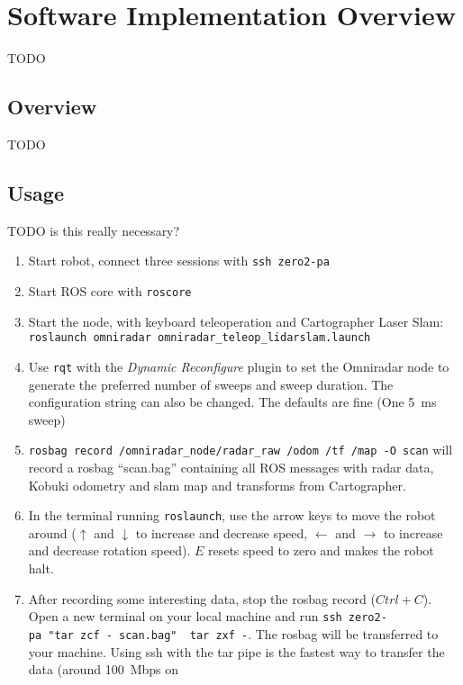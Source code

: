 \section{Software Implementation Overview}\label{overview}

TODO

\subsection{Overview}
TODO

\subsection{Usage}\label{usage}

TODO is this really necessary?

\begin{enumerate}
\def\labelenumi{\arabic{enumi}.}
\tightlist
\item
  Start robot, connect three sessions with \texttt{ssh\ zero2-pa}
\item
  Start ROS core with \texttt{roscore}
\item
  Start the node, with keyboard teleoperation and Cartographer Laser
  Slam:
  \texttt{roslaunch\ omniradar\ omniradar\_teleop\_lidarslam.launch}
\item
  Use \texttt{rqt} with the \emph{Dynamic Reconfigure} plugin to set the
  Omniradar node to generate the preferred number of sweeps and sweep
  duration. The configuration string can also be changed. The defaults
  are fine (One \SI{5}{ms} sweep)
\item
  \texttt{rosbag\ record\ /omniradar\_node/radar\_raw\ /odom\ /tf\ /map\ -O\ scan}
  will record a rosbag ``scan.bag'' containing all ROS messages with
  radar data, Kobuki odometry and slam map and transforms from
  Cartographer.
\item
  In the terminal running \texttt{roslaunch}, use the arrow keys to move
  the robot around (\(\uparrow\) and \(\downarrow\) to increase and
  decrease speed, \(\leftarrow\) and \(\rightarrow\) to increase and
  decrease rotation speed). \(E\) resets speed to zero and makes the
  robot halt.
\item
  After recording some interesting data, stop the rosbag record
  (\(Ctrl+C\)). Open a new terminal on your local machine and run
  \texttt{ssh\ zero2-pa\ "tar\ zcf\ -\ scan.bag"\ \textbar{}\ tar\ zxf\ -}.
  The rosbag will be transferred to your machine. Using ssh with the tar
  pipe is the fastest way to transfer the data (around \SI{100}{Mbps} on

\end{enumerate}
